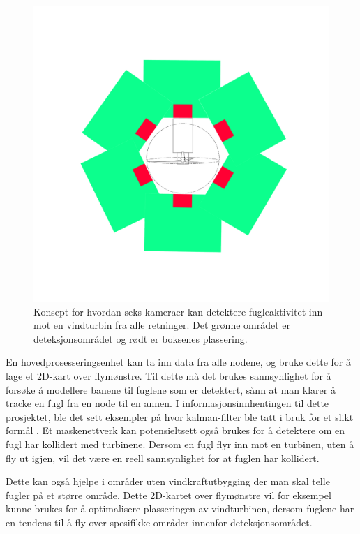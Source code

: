 \begin{figure}[!htbp]
\begin{minipage}[b]{0.45\textwidth}
    \includegraphics[width=\textwidth]{konklusjon/Nettverk.png}
    \caption{Konsept for hvordan seks kameraer kan detektere fugleaktivitet inn mot en vindturbin fra alle retninger. Det grønne området er deteksjonsområdet og rødt er boksenes plassering.}
    \label{fig:fraoven}
  \end{minipage}
\end{figure}

En hovedprosesseringsenhet kan ta inn data fra alle nodene, og bruke dette for å lage et 2D-kart over flymønstre. 
Til dette må det brukes sannsynlighet for å forsøke å modellere banene til fuglene som er detektert, sånn at man klarer å tracke en fugl fra en node til en annen. 
I informasjonsinnhentingen til dette prosjektet, ble det sett eksempler på hvor kalman-filter ble tatt i bruk for et slikt formål \cite{kalman}. 
Et maskenettverk kan potensieltsett også brukes for å detektere om en fugl har kollidert med turbinene. Dersom en fugl flyr inn mot en turbinen, uten å fly ut igjen, vil det være en reell sannsynlighet for at fuglen har kollidert.

Dette kan også hjelpe i områder uten vindkraftutbygging der man skal telle fugler på et større område. 
Dette 2D-kartet over flymønstre vil for eksempel kunne brukes for å optimalisere plasseringen av vindturbinen, dersom fuglene har en tendens til å fly over spesifikke områder innenfor deteksjonsområdet.



